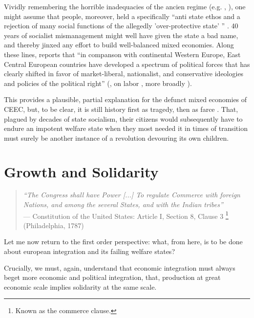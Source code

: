 \documentclass[11pt,a4paper,oneside]{article}
\begin{document}
Vividly remembering the horrible inadequacies of the ancien regime (e.g. \citealt{Szikra2009}, \citealt{Millard1992}), one might assume that people, moreover, held a specifically  ``anti state ethos and a rejection of many social functions of the allegedly 'over-protective state' '' \citep[130]{Millard1992}.
40 years of socialist mismanagement might well have given the state a bad name, and thereby jinxed any effort to build well-balanced mixed economies.
Along these lines, \citeauthor{Inglot2008} reports that ``in companson with continental Western Europe, East Central European countries have developed a spectrum of political forces that has clearly shifted in favor of market-liberal, nationalist, and conservative ideologies and policies of the political right'' (\citeyear[212]{Inglot2008}, on labor \citealt{Crowley2002}, more broadly \citealt{OrenOuto2001}).

This provides a plausible, partial explanation for the defunct mixed economies of \gls{CEEC}, but, to be clear, it is still history first as tragedy, then as farce \citep{Marx1852}.
That, plagued by decades of state socialism, their citizens would subsequently have to endure an impotent welfare state when they most needed it in times of transition must surely be another instance of a revolution devouring its own children.

\section{Growth and Solidarity} \label{sec:growth-solidarity}

\begin{quote}
	\emph{``The Congress shall have Power [...] To regulate Commerce with foreign Nations, and among the several States, and with the Indian tribes''}\\
	--- Constitution of the United States: Article I, Section 8, Clause 3
	\footnote{
		Known as the commerce clause.
	}
	(Philadelphia, 1787)
\end{quote}

Let me now return to the first order perspective:
what, from here, is to be done about european integration and its failing welfare states?

Crucially, we must, again, understand that economic integration must always beget more economic and political integration, that, production at great economic scale implies solidarity at the same scale.
\end{document}
